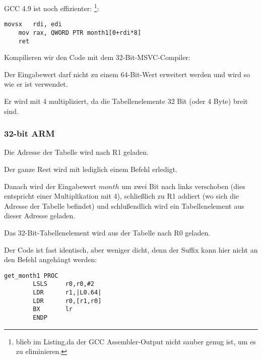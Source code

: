 \Optimizing GCC 4.9 ist noch effizienter:
\footnote{ blieb im Listing,da der GCC Assembler-Output nicht sauber genug ist, um es zu eliminieren.}:

\begin{lstlisting}[caption=\Optimizing GCC 4.9 x64,style=customasmx86]
	movsx	rdi, edi
	mov	rax, QWORD PTR month1[0+rdi*8]
	ret
\end{lstlisting}

Kompilieren wir den Code mit dem 32-Bit-MSVC-Compiler:


Der Eingabewert darf nicht zu einem 64-Bit-Wert erweitert werden und wird so wie er ist verwendet.

Er wird mit 4 multipliziert, da die Tabellenelemente 32 Bit (oder 4 Byte) breit sind.

\subsubsection{32-bit ARM}




Die Adresse der Tabelle wird nach R1 geladen.

Der ganze Rest wird mit lediglich einem \LDR Befehl erledigt.

Danach wird der Eingabewert $month$ um zwei Bit nach links verschoben (dies entspricht einer Multiplikation mit 4),
schließlich zu R1 addiert (wo sich die Adresse der Tabelle befindet) und schlußendlich wird ein Tabellenelement aus
dieser Adresse geladen.

Das 32-Bit-Tabellenelement wird aus der Tabelle nach R0 geladen.

Der Code ist fast identisch, aber weniger dicht, denn der \LSL Suffix kann hier nicht an den \LDR Befehl angehängt
werden:

\begin{lstlisting}[style=customasmARM]
get_month1 PROC
        LSLS     r0,r0,#2
        LDR      r1,|L0.64|
        LDR      r0,[r1,r0]
        BX       lr
        ENDP
\end{lstlisting}

